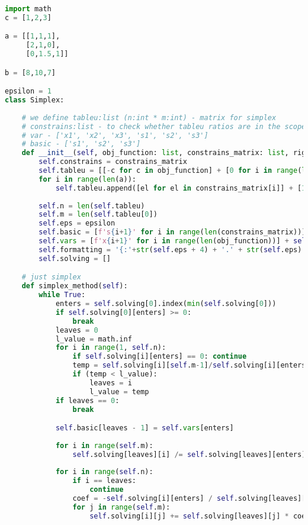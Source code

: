 \documentclass[12pt, legalpaper]{exam}
\begin{document}
\begin{lstlisting}[language=Python, caption=Программа на Python, label=lst:python-code]
import math
c = [1,2,3]

a = [[1,1,1],
     [2,1,0],
     [0,1.5,1]]

b = [8,10,7]

epsilon = 1
class Simplex:
    
    # we define tableu:list (n:int * m:int) - matrix for simplex
    # constrains:list - to check whether tableu ratios are in the scope of them
    # var - ['x1', 'x2', 'x3', 's1', 's2', 's3']
    # basic - ['s1', 's2', 's3']
    def __init__(self, obj_function: list, constrains_matrix: list, right_hand_side_num: list, epsilon:int):
        self.constrains = constrains_matrix
        self.tableu = [[-c for c in obj_function] + [0 for i in range(len(constrains_matrix))] + [0]]
        for i in range(len(a)):
            self.tableu.append([el for el in constrains_matrix[i]] + [1 if i == j else 0 for j in range(len(constrains_matrix))] + [right_hand_side_num[i]])
        
        self.n = len(self.tableu)
        self.m = len(self.tableu[0])
        self.eps = epsilon
        self.basic = [f's{i+1}' for i in range(len(constrains_matrix))]
        self.vars = [f'x{i+1}' for i in range(len(obj_function))] + self.basic
        self.formatting = '{:'+str(self.eps + 4) + '.' + str(self.eps) + 'f}'
        self.solving = []

    # just simplex 
    def simplex_method(self):
        while True:
            enters = self.solving[0].index(min(self.solving[0]))
            if self.solving[0][enters] >= 0:
                break
            leaves = 0
            l_value = math.inf
            for i in range(1, self.n):
                if self.solving[i][enters] == 0: continue
                temp = self.solving[i][self.m-1]/self.solving[i][enters]
                if (temp < l_value):
                    leaves = i
                    l_value = temp
            if leaves == 0:
                break

            self.basic[leaves - 1] = self.vars[enters]
            
            for i in range(self.m):
                self.solving[leaves][i] /= self.solving[leaves][enters]
        
            for i in range(self.n):
                if i == leaves:
                    continue
                coef = -self.solving[i][enters] / self.solving[leaves][enters]
                for j in range(self.m):
                    self.solving[i][j] += self.solving[leaves][j] * coef


\end{lstlisting}
\end{document}
